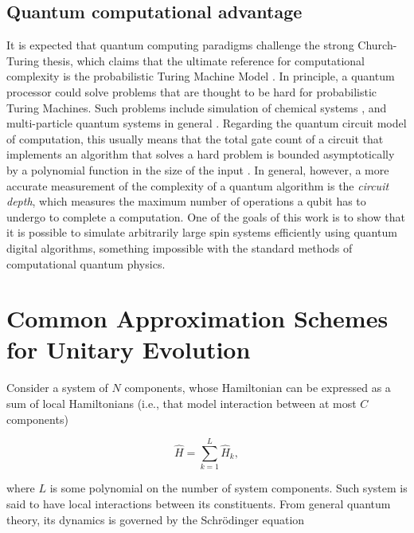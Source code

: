     

  \subsection{Quantum computational advantage}
  \label{subsec:QuantumAdvantage}
    
    It is expected that quantum computing paradigms challenge the strong Church-Turing thesis, which claims that the ultimate reference for computational complexity is the probabilistic Turing Machine Model \cite{Nielsen, Strini}. In principle, a quantum processor could solve problems that are thought to be hard for probabilistic Turing Machines. Such problems include simulation of chemical systems \cite{QuantumChem1, QuantumChem2}, and multi-particle quantum systems in general \cite{Nielsen, LloydFermSim, BerryErrorBounds}. Regarding the quantum circuit model of computation, this usually means that the total gate count of a circuit that implements an algorithm that solves a hard problem is bounded asymptotically by a polynomial function in the size of the input \cite{Nielsen, Strini}. In general, however, a more accurate measurement of the complexity of a quantum algorithm is the \textit{circuit depth}, which measures the maximum number of operations a qubit has to undergo to complete a computation. One of the goals of this work is to show that it is possible to simulate arbitrarily large spin systems efficiently using quantum digital algorithms, something impossible with the standard methods of computational quantum physics.

\section{Common Approximation Schemes for Unitary Evolution}
\label{sec:trotter}

  Consider a system of $N$ components, whose Hamiltonian can be expressed as a sum of local Hamiltonians (i.e., that model interaction between at most $C$ components) \cite{Nielsen,LloydNature}

  \begin{equation}
    \hat{H} = \sum_{k = 1}^{L} \hat{H}_k,
    \label{eq:SparseHam}
  \end{equation}

  \noindent where $L$ is some polynomial on the number of system components. Such system is said to have local interactions between its constituents. From general quantum theory, its dynamics is governed by the Schrödinger equation
  
